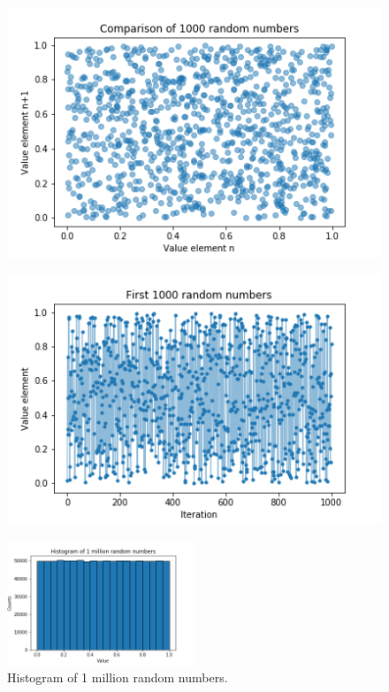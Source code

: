 \begin{figure}[ht]
\centering
\begin{minipage}[t]{.5\textwidth}
  \centering
  \includegraphics[width=1.0\linewidth]{./plots/q1a1.png}
  \captionsetup{width=0.8\linewidth}
  \label{fig:fig1}
\end{minipage}%
\begin{minipage}[t]{.5\textwidth}
  \centering
  \includegraphics[width=1.0\linewidth]{./plots/q1a2.png}
  \captionsetup{width=0.8\linewidth}
  \label{fig:fig2}
\end{minipage}
\end{figure}

\begin{figure}[ht]
    \centering
    \includegraphics[width=0.5\textwidth]{./plots/q1a3.png}
    \caption{Histogram of 1 million random numbers.}
    \label{fig:fig3}
\end{figure}



